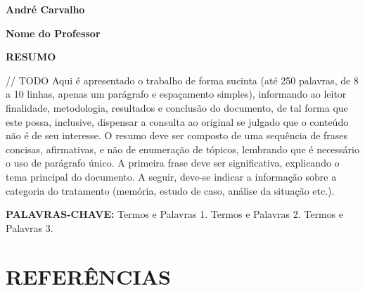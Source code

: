 \documentclass[
    a4paper,          %
    12pt,             %
    section=TITLE,    %
    subsection=Title, %
    oneside,          %
    english,          %
    spanish,          %
    brazil,           %
    fleqn             %
]{abntex2}
\begin{document}
	

  \begin{flushright}
    \textbf{André Carvalho}

    \textbf{Nome do Professor}
  \end{flushright}

  \begin{center}
      \Large \textbf{RESUMO}
  \end{center}

  \noindent // TODO Aqui é apresentado o trabalho de forma sucinta (até 250 palavras, de 8 a 10 linhas, apenas um parágrafo e espaçamento simples), informando ao leitor finalidade, metodologia, resultados e conclusão do documento, de tal forma que este possa, inclusive, dispensar a consulta ao original se julgado que o conteúdo não é de seu interesse. O resumo deve ser composto de uma sequência de frases concisas, afirmativas, e não de enumeração de tópicos, lembrando que é necessário o uso de parágrafo único. A primeira frase deve ser significativa, explicando o tema principal do documento. A seguir, deve-se indicar a informação sobre a categoria do tratamento (memória, estudo de caso, análise da situação etc.).

  \noindent \textbf{PALAVRAS-CHAVE:} Termos e Palavras 1. Termos e Palavras 2. Termos e Palavras 3.

  

  \section{REFERÊNCIAS}

  
\end{document}
